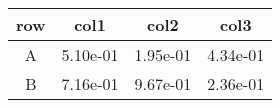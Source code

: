 \begin{tabular}{cccc}
\toprule
row&col1&col2&col3\tabularnewline
\midrule
A&5.10e-01&1.95e-01&4.34e-01\tabularnewline
B&7.16e-01&9.67e-01&2.36e-01\tabularnewline
\bottomrule
\end{tabular}
